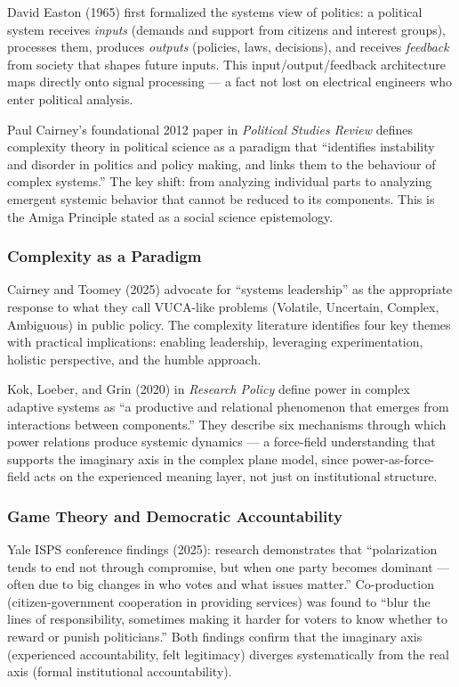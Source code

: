 \documentclass[11pt,letterpaper]{article}
\begin{document}
David Easton (1965) first formalized the systems view of politics: a political system receives \textit{inputs} (demands and support from citizens and interest groups), processes them, produces \textit{outputs} (policies, laws, decisions), and receives \textit{feedback} from society that shapes future inputs. This input/output/feedback architecture maps directly onto signal processing --- a fact not lost on electrical engineers who enter political analysis.

Paul Cairney's foundational 2012 paper in \textit{Political Studies Review} defines complexity theory in political science as a paradigm that ``identifies instability and disorder in politics and policy making, and links them to the behaviour of complex systems.'' The key shift: from analyzing individual parts to analyzing emergent systemic behavior that cannot be reduced to its components. This is the Amiga Principle stated as a social science epistemology.

\subsubsection{Complexity as a Paradigm}

Cairney and Toomey (2025) advocate for ``systems leadership'' as the appropriate response to what they call VUCA-like problems (Volatile, Uncertain, Complex, Ambiguous) in public policy. The complexity literature identifies four key themes with practical implications: enabling leadership, leveraging experimentation, holistic perspective, and the humble approach.

Kok, Loeber, and Grin (2020) in \textit{Research Policy} define power in complex adaptive systems as ``a productive and relational phenomenon that emerges from interactions between components.'' They describe six mechanisms through which power relations produce systemic dynamics --- a force-field understanding that supports the imaginary axis in the complex plane model, since power-as-force-field acts on the experienced meaning layer, not just on institutional structure.

\subsubsection{Game Theory and Democratic Accountability}

Yale ISPS conference findings (2025): research demonstrates that ``polarization tends to end not through compromise, but when one party becomes dominant --- often due to big changes in who votes and what issues matter.'' Co-production (citizen-government cooperation in providing services) was found to ``blur the lines of responsibility, sometimes making it harder for voters to know whether to reward or punish politicians.'' Both findings confirm that the imaginary axis (experienced accountability, felt legitimacy) diverges systematically from the real axis (formal institutional accountability).
\end{document}
